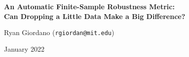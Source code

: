 
\begin{frame}

\begin{center}
\large
\textbf{
An Automatic Finite-Sample Robustness Metric:
\\Can Dropping a Little Data Make a Big Difference?}
\end{center}

%

\hrulefill
\vspace{1em}

Ryan Giordano (\texttt{rgiordan@mit.edu})\footnotemark[1]

January 2022


\end{frame}



